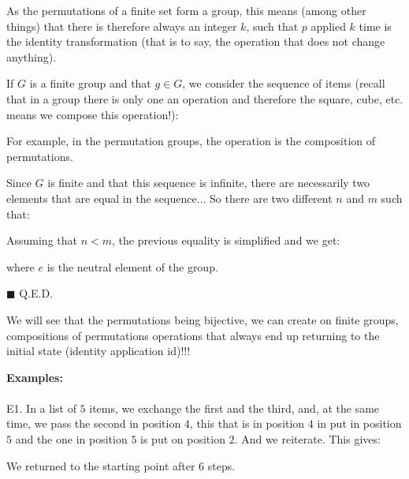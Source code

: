 	\begin{theorem}
	As the permutations of a finite set form a group, this means (among other things) that there is therefore always an integer $k$, such that $p$ applied $k$ time is the identity transformation (that is to say, the operation that does not change anything).
	\end{theorem}
	\begin{dem}
	If $G$ is a finite group and that $g\in G$, we consider the sequence of items (recall that in a group there is only one an operation and therefore the square, cube, etc. means we compose this operation!):
	
	For example, in the permutation groups, the operation is the composition of permutations.
	
	Since $G$ is finite and that this sequence is infinite, there are necessarily two elements that are equal in the sequence... So there are two different $n$ and $m$ such that:
	
	Assuming that $n<m$, the previous equality is simplified and we get:
	
	where $e$ is the neutral element of the group.
	\begin{flushright}
		$\blacksquare$  Q.E.D.
	\end{flushright}
	\end{dem}
	We will see that the permutations being bijective, we can create on finite groups, compositions of permutations operations that always end up returning to the initial state (identity application id)!!!
	\begin{tcolorbox}[colframe=black,colback=white,sharp corners]
	\textbf{{\Large {}}Examples:}\\\\
	E1. In a list of $5$ items, we exchange the first and the third, and, at the same time, we pass the second in position $4$, this that is in position $4$ in put in position $5$ and the one in position $5$ is put on position $2$. And we reiterate. This gives:
	
	We returned to the starting point after $6$ steps.
	\end{tcolorbox}
	
